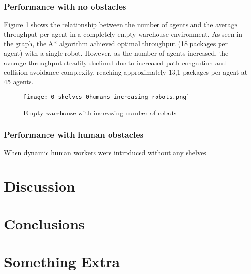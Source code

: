 \documentclass{kththesis}
\begin{document}
\subsection{Performance with no obstacles}
Figure \ref{Empty warehouse increasing robots} shows the relationship between the number of agents and the average throughput per agent in a completely empty warehouse environment. As seen in the graph, the A* algorithm achieved optimal throughput (18 packages per agent) with a single robot. However, as the number of agents increased, the average throughput steadily declined due to increased path congestion and collision avoidance complexity, reaching approximately 13,1 packages per agent at 45 agents.


\begin{figure}
    \centering
    \texttt{[image: 0\_shelves\_0humans\_increasing\_robots.png]}
    \caption{Empty warehouse with increasing number of robots}
    \label{Empty warehouse increasing robots}
\end{figure}

\subsection{Performance with human obstacles}
When dynamic human workers were introduced without any shelves 


\chapter{Discussion}




\chapter{Conclusions}


\printbibliography[heading=bibintoc]

\appendix

\chapter{Something Extra}

\tailmatter
\end{document}
